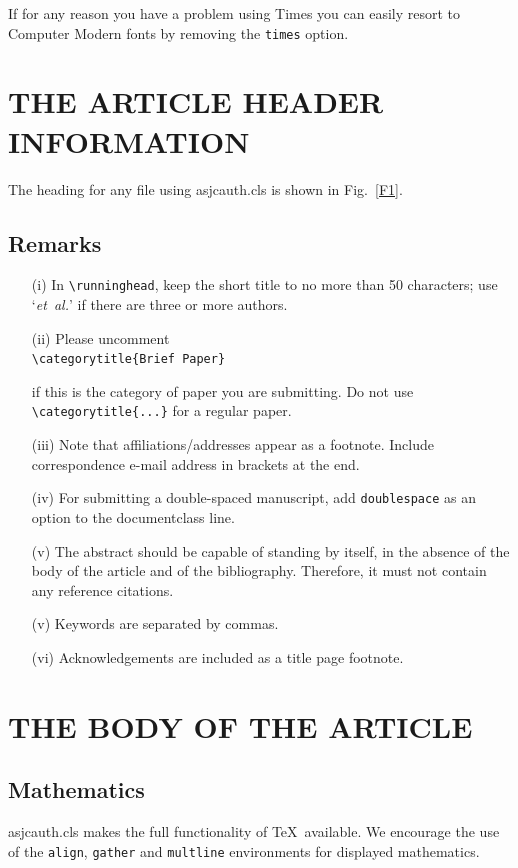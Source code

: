 \documentclass[times]{asjcauth}
\begin{document}
\noindent If for any reason
you have a problem using Times you can easily resort to Computer
Modern fonts by removing the \verb"times" option.

\section{THE ARTICLE HEADER INFORMATION}
The heading for any file using \textsf{asjcauth.cls} is shown in
Fig.~\ref{F1}.

\subsection{Remarks}
\begin{enumerate}
\item[(i)] In \verb"\runninghead", keep the short title to no more
than 50 characters; use `\emph{et~al.}' if there are three or more
authors.

\item[(ii)] Please uncomment\\
\verb+\categorytitle{Brief Paper}+

\noindent if this is the category of paper you are submitting. Do not use
\verb+\categorytitle{...}+ for a regular paper.

\item[(iii)] Note that affiliations/addresses appear as a footnote.
Include correspondence e-mail address in brackets at the end.

\item[(iv)] For submitting a double-spaced manuscript, add
\verb"doublespace" as an option to the document\-class line.

\item[(v)] The abstract should be capable of standing by itself,
in the absence of the body of the article and of the bibliography.
Therefore, it must not contain any reference citations. \item[(v)]
Keywords are separated by commas.

\item[(vi)] Acknowledgements are included as a title page footnote.
\end{enumerate}

\section{THE BODY OF THE ARTICLE}

\subsection{Mathematics} \textsf{asjcauth.cls} makes the full
functionality of \AmS\/\TeX\ available. We encourage the use of
the \verb"align", \verb"gather" and \verb"multline" environments
for displayed mathematics.
\end{document}
